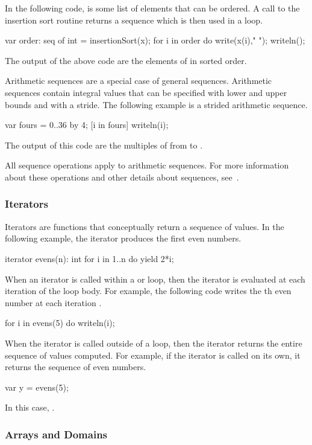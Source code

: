 In the following code,  is some list of elements that can be
ordered.  A call to the insertion sort routine returns a sequence which
is then used in a  loop. 
\begin{chapel}
var order: seq of int = insertionSort(x);
for i in order do write(x(i)," ");
writeln(); 
\end{chapel}
The output of the above code are the elements of  in sorted order.

Arithmetic sequences are a special case of general sequences.  Arithmetic
sequences contain integral values that can be specified with lower and upper
bounds and with a stride.  The following example is a strided arithmetic sequence.
\begin{chapel}
var fours = 0..36 by 4;
[i in fours] writeln(i);
\end{chapel}
The output of this code are the multiples of  from  to
.

All sequence operations apply to arithmetic sequences.  For more information
about these operations and other details about sequences, see~.

\subsubsection{Iterators}
\label{Intro_Iterators}

Iterators are functions that conceptually return a sequence of values.
In the following example, the iterator produces the first  even
numbers.  
\begin{chapel}
iterator evens(n): int {
  for i in 1..n do yield 2*i;
}
\end{chapel}
When an iterator is called within a  or  loop,
then the iterator is evaluated at each iteration of the loop body.
For example, the following code writes the th even number at 
each iteration .
\begin{chapel}
for i in evens(5) do writeln(i);
\end{chapel}
When the iterator is called outside of a loop, then the iterator returns
the entire sequence of values computed.  For example, if the  iterator
is called on its own, it returns the sequence of  even numbers.
\begin{chapel}
var y = evens(5);
\end{chapel}
In this case, .

\subsubsection{Arrays and Domains}
\label{Arrays_and_Domains}

